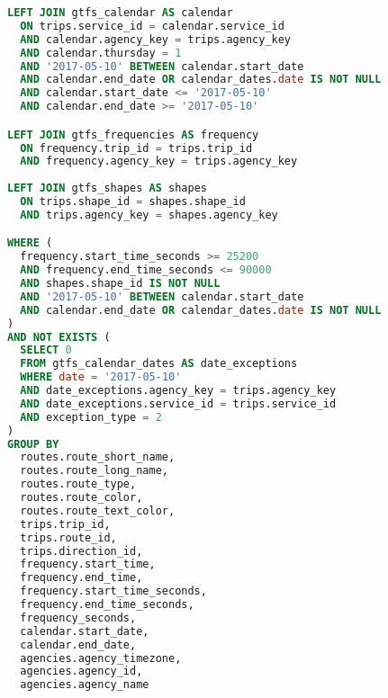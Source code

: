 \begin{newpage}
\begin{lstlisting}[captionpos=t, caption=Postgresql Datenbankabfrage von allen aktiven Trips mit ihrem dazugehörigen Linienverlauf, label=lst:get_active_trips_query, language=SQL]
LEFT JOIN gtfs_calendar AS calendar 
  ON trips.service_id = calendar.service_id
  AND calendar.agency_key = trips.agency_key
  AND calendar.thursday = 1
  AND '2017-05-10' BETWEEN calendar.start_date 
  AND calendar.end_date OR calendar_dates.date IS NOT NULL
  AND calendar.start_date <= '2017-05-10'
  AND calendar.end_date >= '2017-05-10'

LEFT JOIN gtfs_frequencies AS frequency
  ON frequency.trip_id = trips.trip_id
  AND frequency.agency_key = trips.agency_key
    
LEFT JOIN gtfs_shapes AS shapes
  ON trips.shape_id = shapes.shape_id
  AND trips.agency_key = shapes.agency_key

WHERE (
  frequency.start_time_seconds >= 25200 
  AND frequency.end_time_seconds <= 90000
  AND shapes.shape_id IS NOT NULL
  AND '2017-05-10' BETWEEN calendar.start_date 
  AND calendar.end_date OR calendar_dates.date IS NOT NULL
) 
AND NOT EXISTS (
  SELECT 0
  FROM gtfs_calendar_dates AS date_exceptions
  WHERE date = '2017-05-10'
  AND date_exceptions.agency_key = trips.agency_key
  AND date_exceptions.service_id = trips.service_id
  AND exception_type = 2
)
GROUP BY 
  routes.route_short_name,
  routes.route_long_name,
  routes.route_type,
  routes.route_color,
  routes.route_text_color,
  trips.trip_id, 
  trips.route_id,
  trips.direction_id,
  frequency.start_time, 
  frequency.end_time, 
  frequency.start_time_seconds,
  frequency.end_time_seconds,
  frequency_seconds,
  calendar.start_date,
  calendar.end_date,
  agencies.agency_timezone,
  agencies.agency_id,
  agencies.agency_name
\end{lstlisting}
      
\end{newpage}